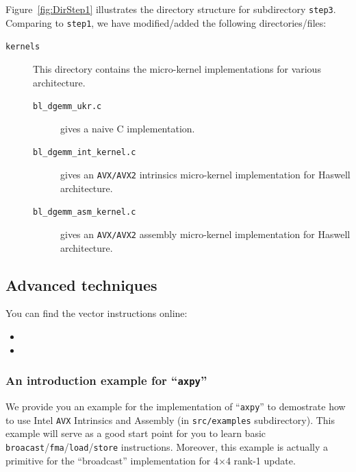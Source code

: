Figure~\ref{fig:DirStep1} illustrates the directory
structure for subdirectory {\tt step3}. Comparing to {\tt step1}, we have modified/added the following directories/files:

\begin{description}
\item[{\tt kernels}] This directory contains the micro-kernel implementations for various architecture.
\begin{description}
\item[{\tt bl\_dgemm\_ukr.c}] gives a naive C implementation.
\item[{\tt bl\_dgemm\_int\_kernel.c}] gives an {\tt AVX/AVX2} intrinsics micro-kernel implementation for Haswell architecture.
\item[{\tt bl\_dgemm\_asm\_kernel.c}] gives an {\tt AVX/AVX2} assembly micro-kernel implementation for Haswell architecture.
\end{description}
\end{description}

\subsection{Advanced techniques}
You can find the vector instructions online:
\begin{itemize}
\item {}
\item {}
\end{itemize}

\subsubsection{An introduction example for ``{\tt axpy}''}
We provide you an example for the implementation of ``{\tt axpy}'' to demostrate how to use Intel {\tt AVX} Intrinsics and Assembly (in {\tt src/examples} subdirectory). This example will serve as a good start point for you to learn basic {\tt broacast}/{\tt fma}/{\tt load}/{\tt store} instructions. Moreover, this example is actually a primitive for the ``broadcast'' implementation for 4$\times$4 rank-1 update.


